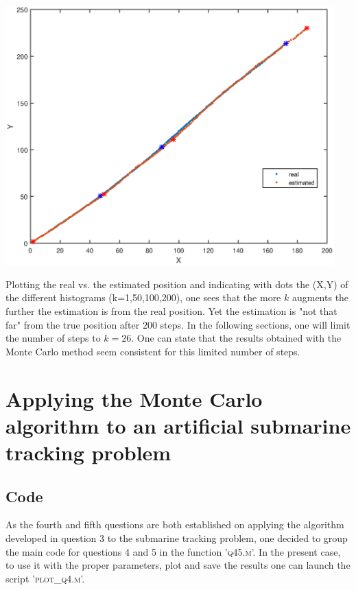 \documentclass[english,DIV=13]{scrreprt}
\begin{document}
\begin{center}
	\begin{minipage}{.6\textwidth}
		\includegraphics[width=0.95\textwidth]{img/q3_path.eps}
	\end{minipage}%
	\begin{minipage}{.4\textwidth}
		Plotting the real vs. the estimated position and indicating with dots the (X,Y) of the 
		different histograms (k=1,50,100,200), one sees that the more $k$ augments
		the further the estimation is from the real position. Yet the estimation is "not that far"
		from the true position after $200$ steps. In the following sections, one will limit the number
		of steps to $k=26$. One can state that the results obtained with the Monte
		Carlo method seem consistent for this limited number of steps.
	\end{minipage}
\end{center}
  
\chapter{Applying the Monte Carlo algorithm to an artificial submarine 
tracking problem}
\section*{Code}
As the fourth and fifth questions are both established on applying the algorithm developed in question
3 to the submarine tracking problem, one decided to group the main code for questions 4 and 5
in the function '\textsc{q45.m}'. In the present case, to use it with the proper parameters, plot
and save the results one can launch the script '\textsc{plot\_q4.m}'.\\
\end{document}
